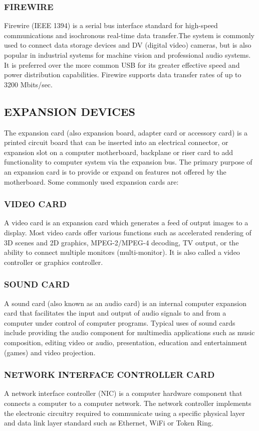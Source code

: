 \documentclass[a4paper,28pt,twoside,openright]{report}
\begin{document}
\subsubsection*{FIREWIRE}
	 Firewire (IEEE 1394) is a serial bus interface standard for high-speed communications
	and isochronous real-time data transfer.The system is commonly used to connect data storage
	devices and DV (digital video) cameras, but is also popular in industrial systems for machine vision and
	professional audio systems. It is preferred over the more common USB for its greater effective speed and
	power distribution capabilities. Firewire supports data transfer rates of up to 3200 Mbits/sec.
\subsection*{EXPANSION DEVICES}
	The expansion card (also expansion board, adapter card or accessory card) is a printed circuit board that can
	be inserted into an electrical connector, or expansion slot on a computer motherboard, backplane or riser card to
	add functionality to computer system via the expansion bus. The primary purpose of an expansion card is to
	provide or expand on features not offered by the motherboard. Some commonly used expansion cards are:
\subsubsection*{VIDEO CARD} 
	A video card is an expansion card which generates a feed of output images to a display.
	Most video cards offer various functions such as accelerated rendering of 3D scenes and 2D graphics,
	MPEG-2/MPEG-4 decoding, TV output, or the ability to connect multiple monitors (multi-monitor). It is
	also called a video controller or graphics controller.
\subsubsection*{SOUND CARD}
	 A sound card (also known as an audio card) is an internal computer expansion card that
	facilitates the input and output of audio signals to and from a computer under control of computer
	programs. Typical uses of sound cards include providing the audio component for multimedia applications
	such as music composition, editing video or audio, presentation, education and entertainment (games) and
	video projection.
\subsubsection*{ NETWORK INTERFACE CONTROLLER CARD}
	 A network interface controller (NIC) is a computer hardware component
	that connects a computer to a computer network. The network controller implements the electronic circuitry
	required to communicate using a specific physical layer and data link layer standard such as Ethernet, WiFi
	or Token Ring.
\end{document}
